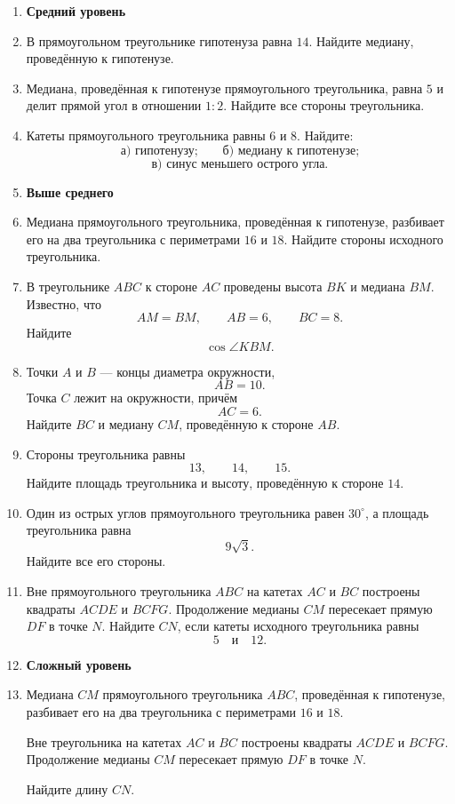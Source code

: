 \documentclass[a4paper,12pt]{article}
\begin{document}
\begin{enumerate}[label=\textbf{\arabic*.}]

\item[]
\textcolor{accent}{\textbf{Средний уровень}}

\item
В прямоугольном треугольнике гипотенуза равна \(14\).
Найдите медиану, проведённую к гипотенузе.

\item
Медиана, проведённая к гипотенузе прямоугольного треугольника,
равна \(5\) и делит прямой угол в отношении \(1:2\).
Найдите все стороны треугольника.

\item
Катеты прямоугольного треугольника равны \(6\) и \(8\).
Найдите:
\[
\text{а) гипотенузу;}
\qquad
\text{б) медиану к гипотенузе;}
\]
\[
\text{в) синус меньшего острого угла.}
\]

\item[]
\textcolor{accent}{\textbf{Выше среднего}}

\item
Медиана прямоугольного треугольника, проведённая к гипотенузе,
разбивает его на два треугольника с периметрами \(16\) и \(18\).
Найдите стороны исходного треугольника.

\item
В треугольнике \(ABC\) к стороне \(AC\) проведены высота \(BK\)
и медиана \(BM\). Известно, что
\[
AM=BM,\qquad AB=6,\qquad BC=8.
\]
Найдите
\[
\cos\angle KBM.
\]

\item
Точки \(A\) и \(B\) --- концы диаметра окружности,
\[
AB=10.
\]
Точка \(C\) лежит на окружности, причём
\[
AC=6.
\]
Найдите \(BC\) и медиану \(CM\), проведённую к стороне \(AB\).

\item
Стороны треугольника равны
\[
13,\qquad14,\qquad15.
\]
Найдите площадь треугольника и высоту, проведённую к стороне \(14\).

\item
Один из острых углов прямоугольного треугольника равен \(30^\circ\),
а площадь треугольника равна
\[
9\sqrt3.
\]
Найдите все его стороны.

\item
Вне прямоугольного треугольника \(ABC\) на катетах \(AC\) и \(BC\)
построены квадраты \(ACDE\) и \(BCFG\).
Продолжение медианы \(CM\) пересекает прямую \(DF\) в точке \(N\).
Найдите \(CN\), если катеты исходного треугольника равны
\[
5\quad\text{и}\quad12.
\]

\item[]
\textcolor{accent}{\textbf{Сложный уровень}}

\item
Медиана \(CM\) прямоугольного треугольника \(ABC\),
проведённая к гипотенузе, разбивает его на два треугольника
с периметрами \(16\) и \(18\).

Вне треугольника на катетах \(AC\) и \(BC\) построены квадраты
\(ACDE\) и \(BCFG\).
Продолжение медианы \(CM\) пересекает прямую \(DF\) в точке \(N\).

Найдите длину \(CN\).

\end{enumerate}
\end{document}
